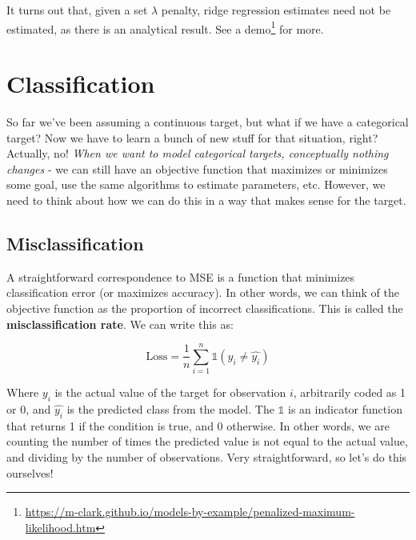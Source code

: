\documentclass[
  letterpaper,
]{krantz}
\DeclareRobustCommand{\href}[2]{#2\footnote{\url{#1}}}
\begin{document}
\begin{tcolorbox}[enhanced jigsaw, bottomrule=.15mm, rightrule=.15mm, colframe=quarto-callout-tip-color-frame, colback=white, breakable, arc=.35mm, left=2mm, opacityback=0, leftrule=.75mm, toprule=.15mm]

It turns out that, given a set \(\lambda\) penalty, ridge regression
estimates need not be estimated, as there is an analytical result. See a
\href{https://m-clark.github.io/models-by-example/penalized-maximum-likelihood.htm}{demo}
for more.

\end{tcolorbox}

\section{Classification}\label{sec-estim-classification}

So far we've been assuming a continuous target, but what if we have a
categorical target? Now we have to learn a bunch of new stuff for that
situation, right? Actually, no! \emph{When we want to model categorical
targets, conceptually nothing changes} - we can still have an objective
function that maximizes or minimizes some goal, use the same algorithms
to estimate parameters, etc. However, we need to think about how we can
do this in a way that makes sense for the target.

\subsection{Misclassification}\label{sec-estim-misclass}

A straightforward correspondence to MSE is a function that minimizes
classification error (or maximizes accuracy). In other words, we can
think of the objective function as the proportion of incorrect
classifications. This is called the \textbf{misclassification rate}. We
can write this as:

\[
\textrm{Loss} = \frac{1}{n} \sum_{i=1}^{n} \mathbb{1}(y_i \neq \hat{y_i})
\]

Where \(y_i\) is the actual value of the target for observation \(i\),
arbitrarily coded as 1 or 0, and \(\hat{y_i}\) is the predicted class
from the model. The \(\mathbb{1}\) is an indicator function that returns
1 if the condition is true, and 0 otherwise. In other words, we are
counting the number of times the predicted value is not equal to the
actual value, and dividing by the number of observations. Very
straightforward, so let's do this ourselves!
\end{document}
